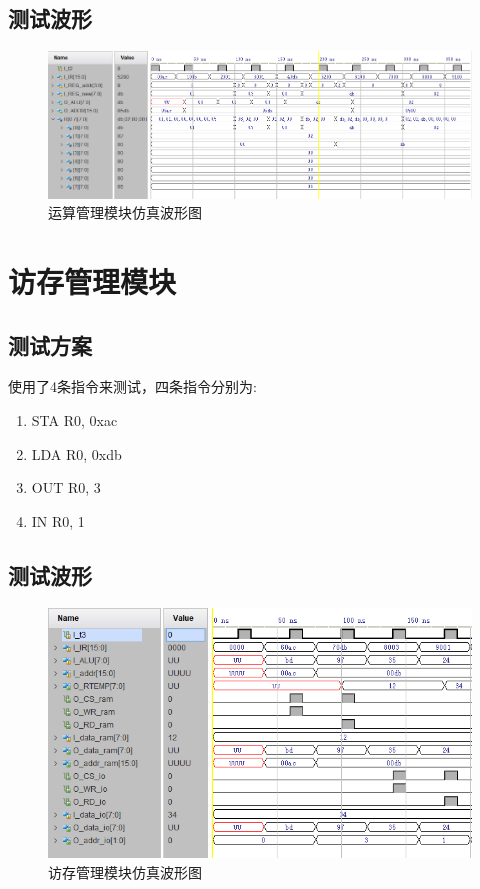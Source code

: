 \documentclass[forprint]{WHUBachelor}
\begin{document}
\subsection{测试波形}

\begin{figure}[H]
  \centering
  \includegraphics[width=6in]{figures/waveforms/alu.png}
  \caption{运算管理模块仿真波形图}
  \label{fig:wave:alu}
\end{figure}


\section{访存管理模块}

\subsection{测试方案}

使用了4条指令来测试，四条指令分别为:
\begin{enumerate}[1.]
\item STA R0, 0xac
\item LDA R0, 0xdb
\item OUT R0, 3
\item IN R0, 1
\end{enumerate}

\subsection{测试波形}

\begin{figure}[H]
  \centering
  \includegraphics[width=5in]{figures/waveforms/refer.png}
  \caption{访存管理模块仿真波形图}
  \label{fig:wave:refer}
\end{figure}
\end{document}
